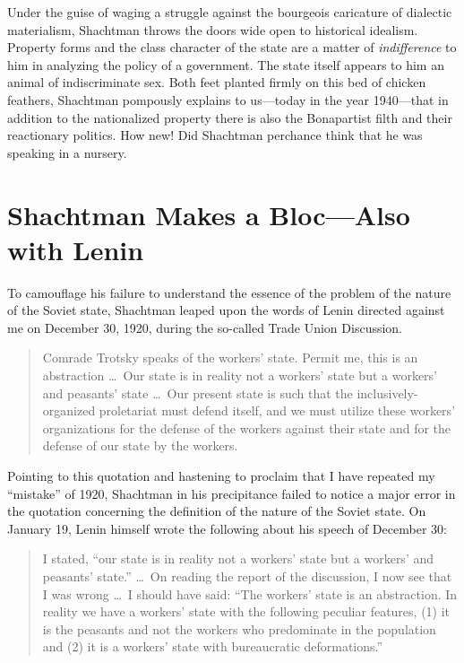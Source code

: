 Under the guise of waging a struggle against the bourgeois caricature of dialectic materialism, Shachtman throws the doors wide open to historical idealism. Property forms and the class character of the state are a matter of \emph{indifference} to him in analyzing the policy of a government. The state itself appears to him an animal of indiscriminate sex. Both feet planted firmly on this bed of chicken feathers, Shachtman pompously explains to us---today in the year 1940---that in addition to the nationalized property there is also the Bonapartist filth and their reactionary politics. How new! Did Shachtman perchance think that he was speaking in a nursery.

\section*{Shachtman Makes a Bloc---Also with Lenin}

To camouflage his failure to understand the essence of the problem of the nature of the Soviet state, Shachtman leaped upon the words of Lenin directed against me on December 30, 1920, during the so-called Trade Union Discussion.

\begin{quote}
  Comrade Trotsky speaks of the workers’ state. Permit me, this is an abstraction \dots\ Our state is in reality not a workers’ state but a workers’ and peasants’ state \dots\ Our present state is such that the inclusively-organized proletariat must defend itself, and we must utilize these workers’ organizations for the defense of the workers against their state and for the defense of our state by the workers.
\end{quote}

Pointing to this quotation and hastening to proclaim that I have repeated my “mistake” of 1920, Shachtman in his precipitance failed to notice a major error in the quotation concerning the definition of the nature of the Soviet state. On January 19, Lenin himself wrote the following about his speech of December 30:

\begin{quote}
  I stated, ``our state is in reality not a workers’ state but a workers’ and peasants’ state.'' \dots\ On reading the report of the discussion, I now see that I was wrong \dots\ I should have said: ``The workers’ state is an abstraction. In reality we have a workers’ state with the following peculiar features, (1) it is the peasants and not the workers who predominate in the population and (2) it is a workers’ state with bureaucratic deformations.''
\end{quote}

